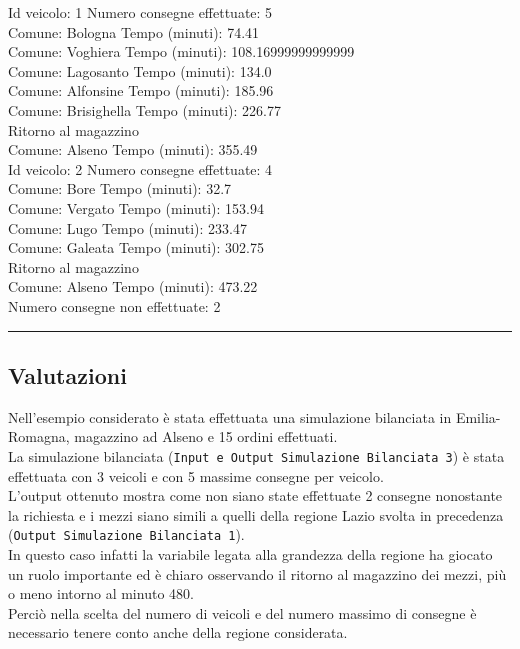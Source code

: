 \documentclass[a4paper,12pt]{report}
\begin{document}
Id veicolo: 1	Numero consegne effettuate: 5\\
Comune: Bologna	 Tempo (minuti): 74.41\\
Comune: Voghiera	 Tempo (minuti): 108.16999999999999\\
Comune: Lagosanto	 Tempo (minuti): 134.0\\
Comune: Alfonsine	 Tempo (minuti): 185.96\\
Comune: Brisighella	 Tempo (minuti): 226.77\\
Ritorno al magazzino\\
Comune: Alseno	 Tempo (minuti): 355.49\\

Id veicolo: 2	Numero consegne effettuate: 4\\
Comune: Bore	 Tempo (minuti): 32.7\\
Comune: Vergato	 Tempo (minuti): 153.94\\
Comune: Lugo	 Tempo (minuti): 233.47\\
Comune: Galeata	 Tempo (minuti): 302.75\\
Ritorno al magazzino\\
Comune: Alseno	 Tempo (minuti): 473.22\\

Numero consegne non effettuate: 2\\
\hrule
\subsection*{Valutazioni}
Nell'esempio considerato è stata effettuata una simulazione bilanciata
in Emilia-Romagna, magazzino ad Alseno e 15 ordini effettuati.\\
La simulazione bilanciata (\texttt{Input e Output Simulazione Bilanciata 3}) è stata effettuata con 3 veicoli e con 5 massime consegne per veicolo.\\
L'output ottenuto mostra come non siano state effettuate 2 consegne nonostante la richiesta e i mezzi
siano simili a quelli della regione Lazio svolta in precedenza (\texttt{Output Simulazione Bilanciata 1}).\\
In questo caso infatti la variabile legata alla grandezza della regione ha giocato un ruolo importante
ed è chiaro osservando il ritorno al magazzino dei mezzi, più o meno intorno al minuto 480.\\
Perciò nella scelta del numero di veicoli e del numero massimo di consegne è necessario tenere conto
anche della regione considerata.\\
\end{document}
